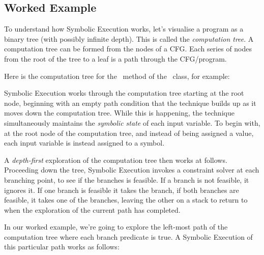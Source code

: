 \subsection{Worked Example}

To understand how Symbolic Execution works, let's visualise a program as a
binary tree (with possibly infinite depth). This is called the {\it computation
tree}. A computation tree can be formed from the nodes of a CFG. Each series of
nodes from the root of the tree to a leaf is a path through the CFG/program.

Here is the computation tree for the \classifymethod~method of the
\triangleclass~class, for example:

%

Symbolic Execution works through the computation tree starting at the root node,
beginning with an empty path condition that the technique builds up as it moves
down the computation tree. While this is happening, the technique simultaneously
maintains the {\it symbolic state} of each input variable. To begin with, at the
root node of the computation tree, and instead of being assigned a value, each
input variable is instead assigned to a symbol. 

A {\it depth-first} exploration of the computation tree then works at follows.
Proceeding down the tree, Symbolic Execution invokes a constraint solver at each
branching point, to see if the branches is feasible. If a branch is not
feasible, it ignores it. If one branch is feasible it takes the branch, if both
branches are feasible, it takes one of the branches, leaving the other on a
stack to return to when the exploration of the current path has completed. 

In our worked example, we're going to explore the left-most path of the
computation tree where each branch predicate is true. A Symbolic Execution of
this particular path works as follows:

